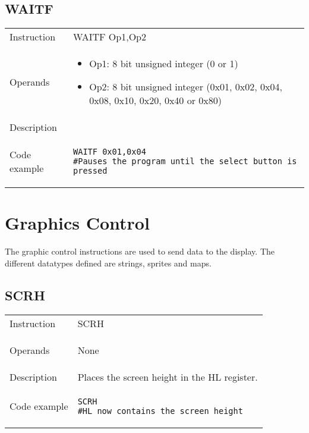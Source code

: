\newpage

\subsection{WAITF}
\renewcommand*{\arraystretch}{2.0}
\begin{longtable}{P{3cm}P{9cm}}
\midrule
\noindent Instruction & WAITF Op1,Op2 \\
\noindent Operands &
\begin{itemize}[label={},noitemsep,leftmargin=*,topsep=0pt,partopsep=0pt, itemsep=1em]
\item Op1: 8 bit unsigned integer (0 or 1)
\item Op2: 8 bit unsigned integer (0x01, 0x02, 0x04, 0x08, 0x10, 0x20, 0x40 or 0x80)
\end{itemize}\\
\noindent Description &  \\
\noindent Code example & 
\begin{lstlisting}
WAITF 0x01,0x04
#Pauses the program until the select button is pressed
\end{lstlisting} \\
\end{longtable}


\newpage

\section{Graphics Control}
The graphic control instructions are used to send data to the display. The different datatypes defined are strings, sprites and maps.

\subsection{SCRH}
\renewcommand*{\arraystretch}{2.0}
\begin{longtable}{P{3cm}P{9cm}}
\midrule
\noindent Instruction & SCRH \\
\noindent Operands &
\begin{itemize}[label={},noitemsep,leftmargin=*,topsep=0pt,partopsep=0pt, itemsep=1em]None\end{itemize}\\
\noindent Description & Places the screen height in the HL register. \\
\noindent Code example & 
\begin{lstlisting}
SCRH
#HL now contains the screen height
\end{lstlisting} \\
\end{longtable}


